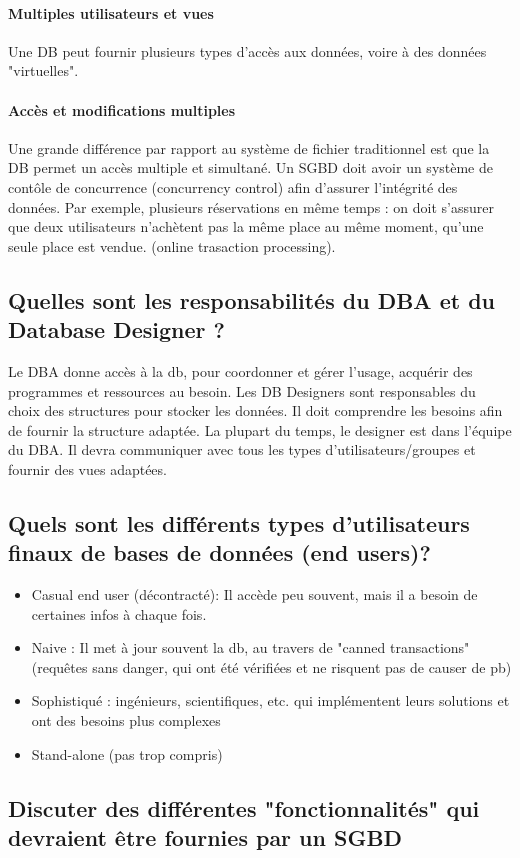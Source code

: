 \paragraph{Multiples utilisateurs et vues} Une DB peut fournir plusieurs 
types d'accès aux données, voire à des données "virtuelles". 

\paragraph{Accès et modifications multiples} Une grande différence par rapport 
au système de fichier traditionnel est que la DB permet un accès 
multiple et simultané. Un SGBD doit avoir un système de contôle de concurrence 
(concurrency control) afin d'assurer l'intégrité des données. 
Par exemple, plusieurs réservations en même temps : on doit s'assurer que 
deux utilisateurs n'achètent pas la même place au même moment, qu'une 
seule place est vendue. (online trasaction processing).


\subsection{Quelles sont les responsabilités du DBA et du Database Designer ?}
Le DBA donne accès à la db, pour coordonner et gérer l'usage, acquérir des programmes et ressources au besoin. Les DB Designers sont responsables du 
choix des structures pour stocker les données. Il doit comprendre les 
besoins afin de fournir la structure adaptée. La plupart du temps, 
le designer est dans l'équipe du DBA. 
Il devra communiquer avec tous les types d'utilisateurs/groupes et 
fournir des vues adaptées. 


\subsection{Quels sont les différents types d'utilisateurs finaux de bases de données (end users)?}
\begin{itemize}
	\item Casual end user (décontracté): Il accède peu souvent, mais il a besoin de certaines infos à chaque fois.
	\item Naive : Il met à jour souvent la db, au travers de "canned transactions" 
	(requêtes sans danger, qui ont été vérifiées et ne risquent pas de causer de pb)
	\item Sophistiqué : ingénieurs, scientifiques, etc. qui implémentent leurs solutions 
	et ont des besoins plus complexes
	\item Stand-alone (pas trop compris)
\end{itemize}


\subsection{Discuter des différentes "fonctionnalités" qui devraient être fournies par un SGBD}
